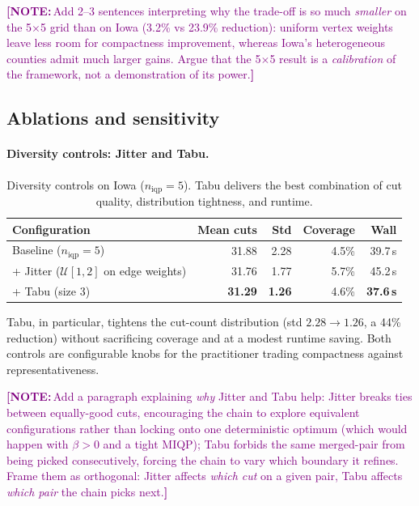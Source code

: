 \documentclass[11pt]{article}
\newcommand{\note}[1]{\textcolor{purple}{\textbf{[NOTE:}\,#1\textbf{]}}}
\begin{document}
\note{Add 2--3 sentences interpreting why the trade-off is so much
\emph{smaller} on the 5$\times$5 grid than on Iowa
(3.2\% vs 23.9\% reduction): uniform vertex weights leave less
room for compactness improvement, whereas Iowa's heterogeneous
counties admit much larger gains. Argue that the 5$\times$5 result
is a \emph{calibration} of the framework, not a demonstration of its
power.}

\subsection{Ablations and sensitivity}\label{sec:exp-ablations}

\paragraph{Diversity controls: Jitter and Tabu.}\label{sec:exp-diversity}

\begin{table}[H]
\centering
\small
\begin{tabular}{lrrrr}
\toprule
Configuration & Mean cuts & Std & Coverage & Wall \\
\midrule
Baseline ($n_{\mathrm{iqp}} = 5$)               & 31.88 & 2.28 & 4.5\% & 39.7\,s \\
+ Jitter ($\mathcal{U}[1,2]$ on edge weights)   & 31.76 & 1.77 & 5.7\% & 45.2\,s \\
+ Tabu (size 3)                                  & \textbf{31.29} & \textbf{1.26} & 4.6\% & \textbf{37.6\,s} \\
\bottomrule
\end{tabular}
\caption{Diversity controls on Iowa ($n_{\mathrm{iqp}} = 5$). Tabu
  delivers the best combination of cut quality, distribution
  tightness, and runtime.}\label{tab:diversity-iowa}
\end{table}

Tabu, in particular, tightens the cut-count distribution
(std $2.28 \to 1.26$, a 44\% reduction) without sacrificing coverage
and at a modest runtime saving. Both controls are configurable knobs
for the practitioner trading compactness against representativeness.

\note{Add a paragraph explaining \emph{why} Jitter and Tabu help:
Jitter breaks ties between equally-good cuts, encouraging the chain
to explore equivalent configurations rather than locking onto one
deterministic optimum (which would happen with $\beta > 0$ and a tight
MIQP); Tabu forbids the same merged-pair from being picked
consecutively, forcing the chain to vary which boundary it refines.
Frame them as orthogonal: Jitter affects \emph{which cut} on a given
pair, Tabu affects \emph{which pair} the chain picks next.}
\end{document}
